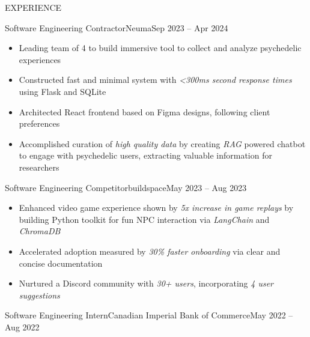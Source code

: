 \documentclass[]{mcdowellcv}
\begin{document}
\makeheader
      

\begin{cvsection}{EXPERIENCE}
	\begin{cvsubsection}{Software Engineering Contractor}{Neuma}{Sep 2023 -- Apr 2024}
		            
		\begin{itemize}%
			\item Leading team of 4 to build immersive tool to collect and analyze psychedelic experiences
			\item Constructed fast and minimal system with \textit{\textless{}300ms second response times} using Flask and SQLite
			\item Architected React frontend based on Figma designs, following client preferences
			\item Accomplished curation of \textit{high quality data} by creating \textit{RAG} powered chatbot to engage with psychedelic users, extracting valuable information for researchers
		\end{itemize}
	\end{cvsubsection}
	\begin{cvsubsection}{Software Engineering Competitor}{buildspace}{May 2023 -- Aug 2023}
		            
		\begin{itemize}%
			\item Enhanced video game experience shown by \textit{5x increase in game replays} by building Python toolkit for fun NPC interaction via \textit{LangChain} and \textit{ChromaDB}
			\item Accelerated adoption measured by \textit{30\% faster onboarding} via clear and concise documentation
			\item Nurtured a Discord community with \textit{30+ users}, incorporating \textit{4 user suggestions}
		\end{itemize}
	\end{cvsubsection}
	\begin{cvsubsection}{Software Engineering Intern}{Canadian Imperial Bank of Commerce}{May 2022 -- Aug 2022}
		            

\end{cvsubsection}
\end{cvsection}
\end{document}
